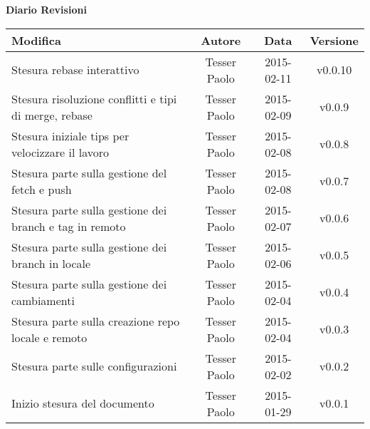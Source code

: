 %

\begin{center}
\begin{small}
	\textbf{\huge Diario Revisioni}
	\vspace{0.5cm}
	\begin{longtable}{|p{6cm}|c|c|c|}
		\hline
		\textbf{Modifica} & \textbf{Autore} & \textbf{Data} & \textbf{Versione} \\
		\hline

		Stesura rebase interattivo & Tesser Paolo & 2015-02-11 & v0.0.10 \\
		\hline
		Stesura risoluzione conflitti e tipi di merge, rebase & Tesser Paolo & 2015-02-09 & v0.0.9 \\
		\hline
		Stesura iniziale tips per velocizzare il lavoro & Tesser Paolo & 2015-02-08 & v0.0.8 \\
		\hline
		Stesura parte sulla gestione del fetch e push & Tesser Paolo & 2015-02-08 & v0.0.7 \\
		\hline
		Stesura parte sulla gestione dei branch e tag in remoto & Tesser Paolo & 2015-02-07 & v0.0.6 \\
		\hline
		Stesura parte sulla gestione dei branch in locale & Tesser Paolo & 2015-02-06 & v0.0.5 \\
		\hline
		Stesura parte sulla gestione dei cambiamenti & Tesser Paolo & 2015-02-04 & v0.0.4 \\
		\hline
		Stesura parte sulla creazione repo locale e remoto & Tesser Paolo & 2015-02-04 & v0.0.3 \\
		\hline
		Stesura parte sulle configurazioni & Tesser Paolo & 2015-02-02 & v0.0.2 \\
		\hline
		Inizio stesura del documento & Tesser Paolo & 2015-01-29 & v0.0.1 \\
		\hline
	\end{longtable}

\end{small}
\end{center}
